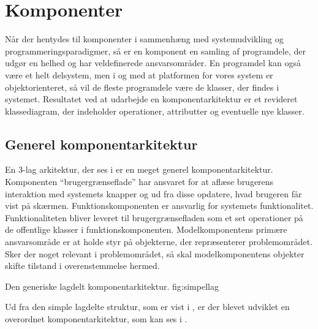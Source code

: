 \section{Komponenter}
\label{sec:komponenter}
Når der hentydes til komponenter i sammenhæng med systemudvikling og programmeringsparadigmer, så er en komponent en samling af programdele, der udgør en helhed og har veldefinerede ansvarsområder. En programdel kan også være et helt delsystem, men i og med at platformen for vores system er objektorienteret, så vil de fleste programdele være de klasser, der findes i systemet\cite[s.~191]{ooad}. 
Resultatet ved at udarbejde en komponentarkitektur er et revideret klassediagram, der indeholder operationer, attributter og eventuelle nye klasser.

\subsection{Generel komponentarkitektur}
En 3-lag arkitektur\cite{Eckerson1995}, der ses i  er en meget generel komponentarkitektur.
Komponenten ``brugergrænseflade'' har ansvaret for at aflæse brugerens interaktion med systemets knapper og ud fra disse opdatere, hvad brugeren får vist på skærmen. 
Funktionskomponenten er ansvarlig for systemets funktionalitet. Funktionaliteten bliver leveret til brugergrænsefladen som et set operationer på de offentlige klasser i funktionskomponenten. 
Modelkomponentens primære ansvarsområde er at holde styr på objekterne, der repræsenterer problemområdet. Sker der noget relevant i problemområdet, så skal modelkomponentens objekter skifte tilstand i overenstemmelse hermed.

	{Den generiske lagdelt komponentarkitektur.}
	{fig:simpellag}

Ud fra den simple lagdelte struktur, som er vist i , er der blevet udviklet en overordnet komponentarkitektur, som kan ses i .




